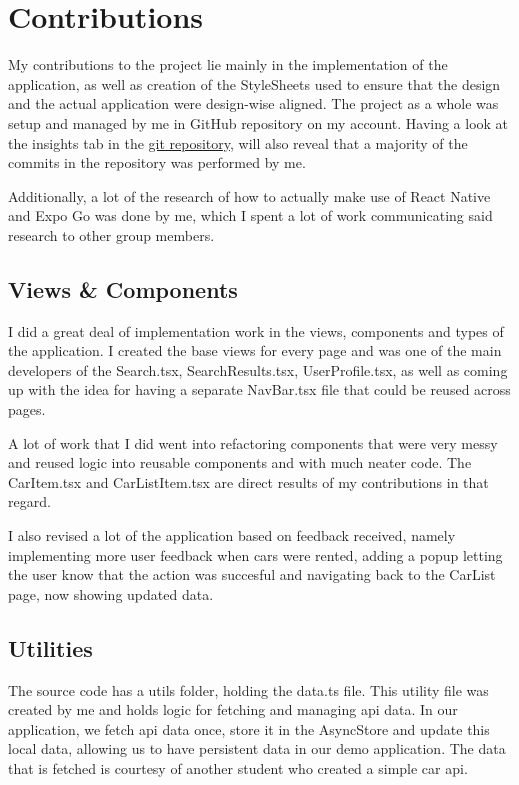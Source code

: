 \section*{Contributions}
My contributions to the project lie mainly in the implementation of the application, as well as creation of the StyleSheets used to ensure that the design and the actual application were design-wise aligned. The project as a whole was setup and managed by me in GitHub repository on my account. Having a look at the insights tab in the \href{https://github.com/Autowinto/MobileSoftApp}{git repository}, will also reveal that a majority of the commits in the repository was performed by me.

Additionally, a lot of the research of how to actually make use of React Native and Expo Go was done by me, which I spent a lot of work communicating said research to other group members.


\subsection*{Views \& Components}
I did a great deal of implementation work in the views, components and types of the application.
I created the base views for every page and was one of the main developers of the Search.tsx, SearchResults.tsx, UserProfile.tsx, as well as coming up with the idea for having a separate NavBar.tsx file that could be reused across pages.

A lot of work that I did went into refactoring components that were very messy and reused logic into reusable components and with much neater code. The CarItem.tsx and CarListItem.tsx are direct results of my contributions in that regard.

I also revised a lot of the application based on feedback received, namely implementing more user feedback when cars were rented, adding a popup letting the user know that the action was succesful and navigating back to the CarList page, now showing updated data.


\subsection*{Utilities}
The source code has a utils folder, holding the data.ts file. This utility file was created by me and holds logic for fetching and managing api data. In our application, we fetch api data once, store it in the AsyncStore and update this local data, allowing us to have persistent data in our demo application. The data that is fetched is courtesy of another student who created a simple car api.

